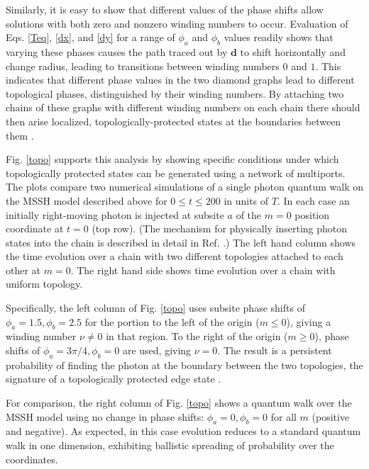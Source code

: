 \documentclass[twocolumn,amsmath, amssymb, superscriptaddress, pra]{revtex4}
\begin{document}
Similarly, it is easy to show that different values of the phase shifts allow
solutions with both zero and nonzero winding numbers to occur.  Evaluation of
Eqs. \ref{Teq},  \ref{dx}, and \ref{dy} for a range of $\phi_a$ and $\phi_b$
values readily shows that varying these phases causes the path traced out by
$\bm d$ to shift horizontally and change radius, leading to transitions between
winding numbers $0$ and $1$.
This indicates that different phase values in the two diamond graphs lead to
different topological phases, distinguished by their winding numbers. By
attaching two chains of these graphs with different winding numbers on each
chain there should then arise localized, topologically-protected states at
the boundaries between them \cite{kitagawa,asboth,hasan}.

Fig. \ref{topo} supports this analysis by showing specific conditions under
which topologically protected states can be generated using a network of
multiports. The plots compare two numerical simulations of a single photon
quantum walk on the MSSH model described above for $0\leq t \leq 200$ in
units of $T$. In each case an initially right-moving photon is injected at
subsite $a$ of the $m=0$ position coordinate at $t=0$ (top row). (The
mechanism for physically inserting photon states into the chain is described
in detail in Ref. \cite{simham}.) The left hand column shows the time
evolution over a chain with two different topologies attached to each other
at $m=0$. The right hand side shows time evolution over a chain with uniform
topology.

Specifically, the left column of Fig. \ref{topo} uses subsite phase shifts of
$\phi_{a}=1.5, \phi_{b}=2.5$ for the portion to the left of the origin
($m\leq 0$), giving a winding number $\nu\ne0$ in that region. To the right
of the origin ($m\geq0$), phase shifts of $\phi_{a}=3\pi/4, \phi_{b}=0$ are
used, giving $\nu=0$. The result is a persistent probability of finding the
photon at the boundary between the two topologies, the signature of a
topologically protected edge state \cite{kitagawa}.

For comparison, the right column of Fig. \ref{topo} shows a quantum walk over the MSSH model using no change in phase shifts: $\phi_{a}=0, \phi_{b}=0$ for all
$m$ (positive and negative). As expected, in this case evolution reduces to a standard quantum walk in one dimension, exhibiting ballistic spreading of
probability over the coordinates.
\end{document}

